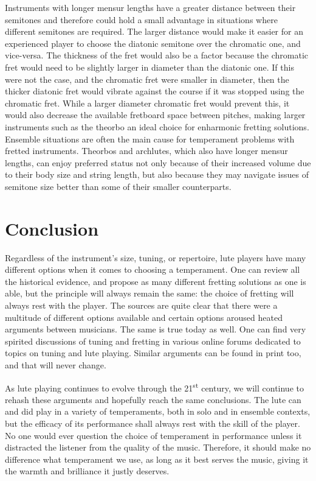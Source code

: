 Instruments with longer mensur lengths have a greater distance between their semitones and therefore
could hold a small advantage in situations where different semitones are required. The larger
distance would make it easier for an experienced player to choose the diatonic semitone over the
chromatic one, and vice-versa. The thickness of the fret would also be a factor because the
chromatic fret would need to be slightly larger in diameter than the diatonic one. If this were not
the case, and the chromatic fret were smaller in diameter, then the thicker diatonic fret would
vibrate against the course if it was stopped using the chromatic fret.  While a larger diameter
chromatic fret would prevent this, it would also decrease the available fretboard space between
pitches, making larger instruments such as the theorbo an ideal choice for enharmonic fretting
solutions.  Ensemble situations are often the main cause for temperament problems with fretted
instruments.  Theorbos and archlutes, which also have longer mensur lengths, can enjoy preferred
status not only because of their increased volume due to their body size and string length, but also
because they may navigate issues of semitone size better than some of their smaller counterparts.

\section{Conclusion}

Regardless of the instrument's size, tuning, or repertoire, lute players have many
different options when it comes to choosing a temperament.  One can review all the
historical evidence, and propose as many different fretting solutions as one is able,
but the principle will always remain the same: the choice of fretting will always rest
with the player. The sources are quite clear that there were a multitude of different
options available and certain options aroused heated arguments between musicians. The
same is true today as well. One can find very spirited discussions of tuning and
fretting in various online forums dedicated to topics on tuning and lute playing.
Similar arguments can be found in print too, and that will never change. \autocite{DD:4}

As lute playing continues to evolve through the 21\textsuperscript{st} century, we will continue to
rehash these arguments and hopefully reach the same conclusions. The lute can and did play in a
variety of temperaments, both in solo and in ensemble contexts, but the efficacy of its performance
shall always rest with the skill of the player. No one would ever question the choice of temperament
in performance unless it distracted the listener from the quality of the music.  Therefore, it
should make no difference what temperament we use, as long as it best serves the music, giving it
the warmth and brilliance it justly deserves.
